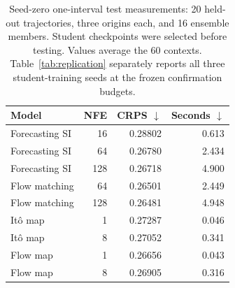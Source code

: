 \begin{table}[t]
\caption{Seed-zero one-interval test measurements: 20 held-out trajectories, three origins each, and 16 ensemble members. Student checkpoints were selected before testing. Values average the 60 contexts. Table~\ref{tab:replication} separately reports all three student-training seeds at the frozen confirmation budgets.}
\label{tab:seed0-test}
\centering
\begin{tabular}{lrrr}
\toprule
Model & NFE & CRPS $\downarrow$ & Seconds $\downarrow$ \\
\midrule
Forecasting SI & 16 & 0.28802 & 0.613 \\
Forecasting SI & 64 & 0.26780 & 2.434 \\
Forecasting SI & 128 & 0.26718 & 4.900 \\
Flow matching & 64 & 0.26501 & 2.449 \\
Flow matching & 128 & 0.26481 & 4.948 \\
It\^o map & 1 & 0.27287 & 0.046 \\
It\^o map & 8 & 0.27052 & 0.341 \\
Flow map & 1 & 0.26656 & 0.043 \\
Flow map & 8 & 0.26905 & 0.316 \\
\bottomrule
\end{tabular}
\end{table}
